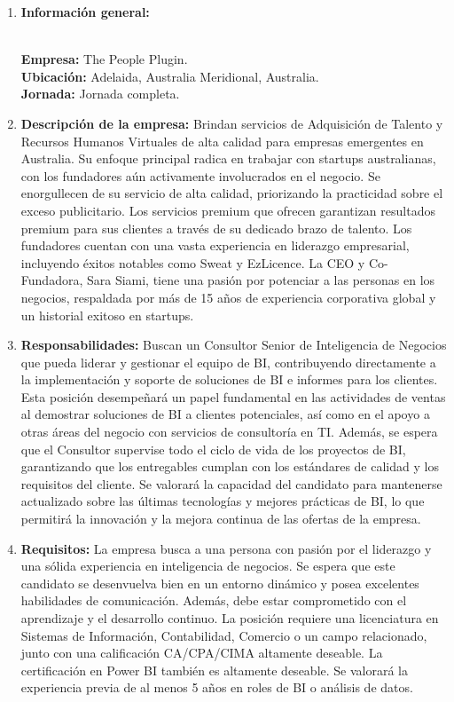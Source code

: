 \documentclass[12pt]{article}
\begin{document}
                \begin{enumerate}
                    \item \textbf{Información general:}
                    
                        \textbf{\\Empresa:} The People Plugin.
                        \textbf{\\Ubicación:} Adelaida, Australia Meridional, Australia.
                        \textbf{\\Jornada:} Jornada completa.

                    \item \textbf{Descripción de la empresa:}
                        Brindan servicios de Adquisición de Talento y Recursos Humanos Virtuales de alta calidad para empresas emergentes en Australia. Su enfoque principal radica en trabajar con startups australianas, con los fundadores aún activamente involucrados en el negocio. Se enorgullecen de su servicio de alta calidad, priorizando la practicidad sobre el exceso publicitario. Los servicios premium que ofrecen garantizan resultados premium para sus clientes a través de su dedicado brazo de talento. Los fundadores cuentan con una vasta experiencia en liderazgo empresarial, incluyendo éxitos notables como Sweat y EzLicence. La CEO y Co-Fundadora, Sara Siami, tiene una pasión por potenciar a las personas en los negocios, respaldada por más de 15 años de experiencia corporativa global y un historial exitoso en startups.

                    \item \textbf{Responsabilidades:}
                        Buscan un Consultor Senior de Inteligencia de Negocios que pueda liderar y gestionar el equipo de BI, contribuyendo directamente a la implementación y soporte de soluciones de BI e informes para los clientes. Esta posición desempeñará un papel fundamental en las actividades de ventas al demostrar soluciones de BI a clientes potenciales, así como en el apoyo a otras áreas del negocio con servicios de consultoría en TI. Además, se espera que el Consultor supervise todo el ciclo de vida de los proyectos de BI, garantizando que los entregables cumplan con los estándares de calidad y los requisitos del cliente. Se valorará la capacidad del candidato para mantenerse actualizado sobre las últimas tecnologías y mejores prácticas de BI, lo que permitirá la innovación y la mejora continua de las ofertas de la empresa.

                    \item \textbf{Requisitos:}
                        La empresa busca a una persona con pasión por el liderazgo y una sólida experiencia en inteligencia de negocios. Se espera que este candidato se desenvuelva bien en un entorno dinámico y posea excelentes habilidades de comunicación. Además, debe estar comprometido con el aprendizaje y el desarrollo continuo. La posición requiere una licenciatura en Sistemas de Información, Contabilidad, Comercio o un campo relacionado, junto con una calificación CA/CPA/CIMA altamente deseable. La certificación en Power BI también es altamente deseable. Se valorará la experiencia previa de al menos 5 años en roles de BI o análisis de datos.


\end{enumerate}
\end{document}
